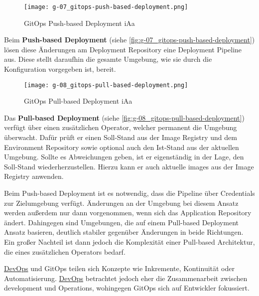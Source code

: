 \begin{figure}[h]
    \centering
    \texttt{[image: g-07\_gitops-push-based-deployment.png]}
    \caption{GitOps Push-based Deployment \acrshort{iAa} \citeauthor{109:GitOps}}
    \label{fig:g-07_gitops-push-based-deployment}
\end{figure}

Beim \textbf{Push-based Deployment} (siehe \autoref{fig:g-07_gitops-push-based-deployment}) lösen diese Änderungen am Deployment Repository eine Deployment Pipeline aus. Diese stellt daraufhin die gesamte Umgebung, wie sie durch die Konfiguration vorgegeben ist, bereit. \cite{109:GitOps}

\begin{figure}[h]
    \centering
    \texttt{[image: g-08\_gitops-pull-based-deployment.png]}
    \caption{GitOps Pull-based Deployment \acrshort{iAa} \citeauthor{109:GitOps}}
    \label{fig:g-08_gitops-pull-based-deployment}
\end{figure}

Das \textbf{Pull-based Deployment} (siehe \autoref{fig:g-08_gitops-pull-based-deployment}) verfügt über einen zusätzlichen Operator, welcher permanent die Umgebung überwacht. Dafür prüft er einen Soll-Stand aus der Image Registry und dem Environment Repository sowie optional auch den Ist-Stand aus der aktuellen Umgebung. Sollte es Abweichungen geben, ist er eigenständig in der Lage, den Soll-Stand wiederherzustellen. Hierzu kann er auch aktuelle \Glspl{image} aus der Image Registry anwenden. \cite{109:GitOps}

Beim Push-based Deployment ist es notwendig, dass die Pipeline über Credentials zur Zielumgebung verfügt. Änderungen an der Umgebung bei diesem Ansatz werden außerdem nur dann vorgenommen, wenn sich das Application Repository ändert. Dahingegen sind Umgebungen, die auf einem Pull-based Deployment Ansatz basieren, deutlich stabiler gegenüber Änderungen in beide Richtungen. Ein großer Nachteil ist dann jedoch die Komplexität einer Pull-based Architektur, die eines zusätzlichen Operators bedarf. \cite{109:GitOps}

\hyperref[sec:03-01_introduction-to-devops]{DevOps} und GitOps teilen sich Konzepte wie Inkremente, Kontinuität oder Automatisierung. \hyperref[sec:03-01_introduction-to-devops]{DevOps} betrachtet jedoch eher die Zusammenarbeit zwischen \Gls{development} und Operations, wohingegen GitOps sich auf Entwickler fokussiert. \cite{009:GitOps-Evolution-of-DevOps}
